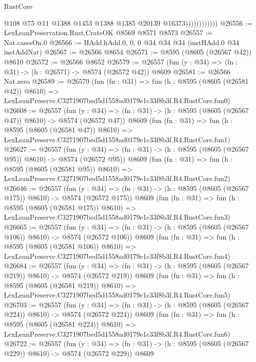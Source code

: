 \begin{lexlean}{RustCore}
\begin{coremodule}
                            @108
                            @75
                            @11
                            @1388
                            @1453
                            @1388
                            @1385
                            @20139
                            @16373))))))))))))
@26556 := LexLeanPreservation.Rust.CrateOK @8569 @8571 @8573
@26557 := Nat.casesOn.{0}
@26566 := HAdd.hAdd.{0, 0, 0} @34 @34 @34 (instHAdd.{0} @34 instAddNat)
@26567 := @26566 @8654
@26571 := @8595 (@8605 (@26567 @42)) @8610
@26572 := @26566 @8652
@26579 := @26557 (fun (y : @34) => (fn : @31) -> (h : @26571) -> @8574 (@26572 @42)) @8609
@26581 := @26566 Nat.zero
@26589 := @26579
    (fun (fn : @31) =>
    fun (h : @8595 (@8605 (@26581 @42)) @8610) =>
    LexLeanPreserve.C3271907bed5d1558ad0179e1c33f8b3f.R4.RustCore.fun0)
@26608 := @26557
    (fun (y : @34) => (fn : @31) -> (h : @8595 (@8605 (@26567 @47)) @8610) -> @8574 (@26572 @47))
    @8609
    (fun (fn : @31) =>
    fun (h : @8595 (@8605 (@26581 @47)) @8610) =>
    LexLeanPreserve.C3271907bed5d1558ad0179e1c33f8b3f.R4.RustCore.fun1)
@26627 := @26557
    (fun (y : @34) => (fn : @31) -> (h : @8595 (@8605 (@26567 @95)) @8610) -> @8574 (@26572 @95))
    @8609
    (fun (fn : @31) =>
    fun (h : @8595 (@8605 (@26581 @95)) @8610) =>
    LexLeanPreserve.C3271907bed5d1558ad0179e1c33f8b3f.R4.RustCore.fun2)
@26646 := @26557
    (fun (y : @34) => (fn : @31) -> (h : @8595 (@8605 (@26567 @175)) @8610) -> @8574 (@26572 @175))
    @8609
    (fun (fn : @31) =>
    fun (h : @8595 (@8605 (@26581 @175)) @8610) =>
    LexLeanPreserve.C3271907bed5d1558ad0179e1c33f8b3f.R4.RustCore.fun3)
@26665 := @26557
    (fun (y : @34) => (fn : @31) -> (h : @8595 (@8605 (@26567 @106)) @8610) -> @8574 (@26572 @106))
    @8609
    (fun (fn : @31) =>
    fun (h : @8595 (@8605 (@26581 @106)) @8610) =>
    LexLeanPreserve.C3271907bed5d1558ad0179e1c33f8b3f.R4.RustCore.fun4)
@26684 := @26557
    (fun (y : @34) => (fn : @31) -> (h : @8595 (@8605 (@26567 @219)) @8610) -> @8574 (@26572 @219))
    @8609
    (fun (fn : @31) =>
    fun (h : @8595 (@8605 (@26581 @219)) @8610) =>
    LexLeanPreserve.C3271907bed5d1558ad0179e1c33f8b3f.R4.RustCore.fun5)
@26703 := @26557
    (fun (y : @34) => (fn : @31) -> (h : @8595 (@8605 (@26567 @224)) @8610) -> @8574 (@26572 @224))
    @8609
    (fun (fn : @31) =>
    fun (h : @8595 (@8605 (@26581 @224)) @8610) =>
    LexLeanPreserve.C3271907bed5d1558ad0179e1c33f8b3f.R4.RustCore.fun6)
@26722 := @26557
    (fun (y : @34) => (fn : @31) -> (h : @8595 (@8605 (@26567 @229)) @8610) -> @8574 (@26572 @229))
    @8609

\end{coremodule}
\end{lexlean}
